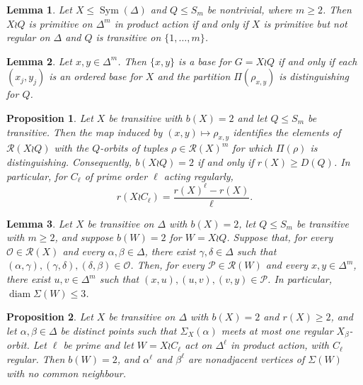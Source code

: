 \documentclass[10pt,a4paper]{amsart}
\newtheorem{lem}{Lemma}
\newtheorem{prop}{Proposition}
\newcommand\Symgrp{\operatorname{Sym}}
\newcommand\diam{\operatorname{diam}}
\begin{document}
\begin{lem}\label{paprim}
Let $X\le\Symgrp(\Delta)$ and $Q\le S_m$ be nontrivial, where $m\ge2$. Then $X\wr Q$ is primitive on $\Delta^m$ in product action if and only if $X$ is primitive but not regular on $\Delta$ and $Q$ is transitive on $\{1,\dots,m\}$.
\end{lem}

\begin{lem}\label{basecrit}
Let $x,y\in\Delta^m$. Then $\{x,y\}$ is a base for $G=X\wr Q$ if and only if each $(x_j,y_j)$ is an ordered base for $X$ and the partition $\Pi(\rho_{x,y})$ is distinguishing for $Q$.
\end{lem}

\begin{prop}\label{bookkeeping}
Let $X$ be transitive with $b(X)=2$ and let $Q\le S_m$ be transitive. Then the map induced by $(x,y)\mapsto\rho_{x,y}$ identifies the elements of $\mathcal R(X\wr Q)$ with the $Q$-orbits of tuples $\rho\in\mathcal R(X)^m$ for which $\Pi(\rho)$ is distinguishing. Consequently, $b(X\wr Q)=2$ if and only if $r(X)\ge D(Q)$. In particular, for $C_\ell$ of prime order $\ell$ acting regularly,
\begin{equation}\label{eq:cyc}
r(X\wr C_\ell)=\frac{r(X)^\ell-r(X)}{\ell}.
\end{equation}
\end{prop}

\begin{lem}\label{inherit}
Let $X$ be transitive on $\Delta$ with $b(X)=2$, let $Q\le S_m$ be transitive with $m\ge2$, and suppose $b(W)=2$ for $W=X\wr Q$. Suppose that, for every $\mathcal O\in\mathcal R(X)$ and every $\alpha,\beta\in\Delta$, there exist $\gamma,\delta\in\Delta$ such that $(\alpha,\gamma),(\gamma,\delta),(\delta,\beta)\in\mathcal O$. Then, for every $\mathcal P\in\mathcal R(W)$ and every $x,y\in\Delta^m$, there exist $u,v\in\Delta^m$ such that $(x,u),(u,v),(v,y)\in\mathcal P$. In particular, $\diam\Sigma(W)\le 3$.
\end{lem}

\begin{prop}\label{cprop}
Let $X$ be transitive on $\Delta$ with $b(X)=2$ and $r(X)\ge 2$, and let $\alpha,\beta\in\Delta$ be distinct points such that $\Sigma_X(\alpha)$ meets at most one regular $X_\beta$-orbit. Let $\ell$ be prime and let $W=X\wr C_\ell$ act on $\Delta^\ell$ in product action, with $C_\ell$ regular. Then $b(W)=2$, and $\alpha^\ell$ and $\beta^\ell$ are nonadjacent vertices of $\Sigma(W)$ with no common neighbour.
\end{prop}
\end{document}
